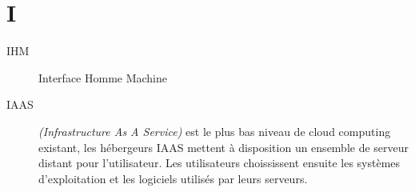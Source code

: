 \section{I}

\begin{description}

\item[IHM] Interface Homme Machine

\item[IAAS] \textit{(Infrastructure As A Service)} est le plus bas niveau de cloud
 computing existant, les hébergeurs IAAS mettent à disposition un ensemble de serveur
 distant pour l'utilisateur. Les utilisateurs choississent ensuite les systèmes d'exploitation
 et les logiciels utilisés par leurs serveurs. 

\end{description}
